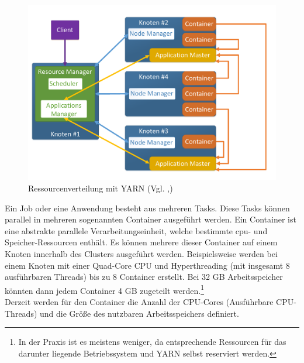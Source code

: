 \begin{figure}[ht]
  \centering
  \includegraphics[width=\textwidth]{./resource/yarn_cluster_architecture.pdf}
  \caption{Ressourcenverteilung mit YARN (Vgl. \cite{yarn_architecture},\cite{expert_hadoop_admin})}
  \label{fig:yarn_cluster_architecture}
\end{figure}

\noindent
Ein Job oder eine Anwendung besteht aus mehreren Tasks. Diese Tasks können parallel in mehreren sogenannten Container ausgeführt werden. Ein Container ist eine abstrakte parallele Verarbeitungseinheit, welche bestimmte \acrshort{cpu}- und Speicher-Ressourcen enthält. Es können mehrere dieser Container auf einem Knoten innerhalb des Clusters ausgeführt werden. Beispielsweise werden bei einem Knoten mit einer Quad-Core CPU und Hyperthreading (mit insgesamt 8 ausführbaren Threads) bis zu 8 Container erstellt. Bei 32 GB Arbeitsspeicher könnten dann jedem Container 4 GB zugeteilt werden.\footnote{In der Praxis ist es meistens weniger, da entsprechende Ressourcen für das darunter liegende Betriebssystem und YARN selbst reserviert werden.}\\
Derzeit werden für den Container die Anzahl der CPU-Cores (Ausführbare CPU-Threads) und die Größe des nutzbaren Arbeitsspeichers definiert.\cite[S. 48 ff.]{expert_hadoop_admin}\\

